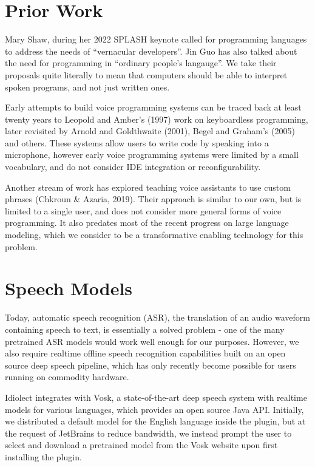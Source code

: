 \documentclass[conference]{IEEEtran}
\begin{document}
\section{Prior Work}

Mary Shaw, during her 2022 SPLASH keynote called for programming languages to address the needs of ``vernacular developers''. Jin Guo has also talked about the need for programming in ``ordinary people's langauge''. We take their proposals quite literally to mean that computers should be able to interpret spoken programs, and not just written ones.

Early attempts to build voice programming systems can be traced back at least twenty years to Leopold and Amber's (1997) work on keyboardless programming, later revisited by Arnold and Goldthwaite (2001), Begel and Graham's (2005) and others. These systems allow users to write code by speaking into a microphone, however early voice programming systems were limited by a small vocabulary, and do not consider IDE integration or reconfigurability.

Another stream of work has explored teaching voice assistants to use custom phrases (Chkroun \& Azaria, 2019). Their approach is similar to our own, but is limited to a single user, and does not consider more general forms of voice programming. It also predates most of the recent progress on large language modeling, which we consider to be a transformative enabling technology for this problem.

\section{Speech Models}

Today, automatic speech recognition (ASR), the translation of an audio waveform containing speech to text, is essentially a solved problem - one of the many pretrained ASR models would work well enough for our purposes. However, we also require realtime offline speech recognition capabilities built on an open source deep speech pipeline, which has only recently become possible for users running on commodity hardware.

Idiolect integrates with Vosk, a state-of-the-art deep speech system with realtime models for various languages, which provides an open source Java API. Initially, we distributed a default model for the English language inside the plugin, but at the request of JetBrains to reduce bandwidth, we instead prompt the user to select and download a pretrained model from the Vosk website upon first installing the plugin.
\end{document}
